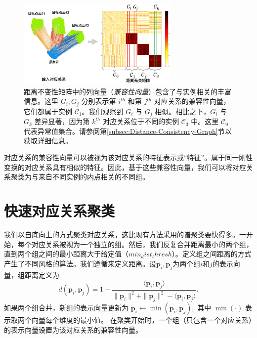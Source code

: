 \begin{figure}[ht]
    \centering
    \includegraphics[width=0.7\textwidth]{images/matrix1.png} %
    \caption{距离不变性矩阵中的列向量（\emph{兼容性向量}）包含了与实例相关的丰富信息。这里 $G_i,G_j$ 分别表示第 $i^{th}$ 和第 $j^{th}$ 对应关系的兼容性向量，它们都属于实例 $\mathcal{C}_1$。我们观察到 $G_i$ 与 $G_j$ 相似。相比之下，$G_i$ 与 $G_k$ 差异显著，因为第 $k^{th}$ 对应关系位于不同的实例 $\mathcal{C}_3$ 中。这里 $\mathcal{C}_0$ 代表异常值集合。请参阅第\ref{subsec:Distance-Consistency-Graph}节以获取详细信息。}
    \label{fig:matrix}
    \vspace{-0.6in}
\end{figure}

对应关系的兼容性向量可以被视为该对应关系的特征表示或“特征”。属于同一刚性变换的对应关系具有相似的特征。因此，基于这些兼容性向量，我们可以将对应关系聚类为与来自不同实例的内点相关的不同组。

\section{快速对应关系聚类}
我们以自底向上的方式聚类对应关系，这比现有方法采用的谱聚类\cite{parra2019practical}\cite{shi2021robin}要快得多。一开始，每个对应关系被视为一个独立的组。然后，我们反复合并距离最小的两个组，直到两个组之间的最小距离大于给定值（$min_dist_thresh$）。定义组之间距离的方式产生了不同风格的算法。我们遵循\cite{Tlinkage}来定义距离。设$\mathbf{p}_i, \mathbf{p}_j$为两个组$i$和$j$的表示向量，组距离定义为
\begin{equation}
d(\mathbf{p}_i, \mathbf{p}_j)= 1-\frac{\langle \mathbf{p}_i,\mathbf{p}_j\rangle}{\parallel \mathbf{p}_i\parallel ^2+\parallel \mathbf{p}_j\parallel ^2-\langle \mathbf{p}_i,\mathbf{p}_j\rangle}.
\end{equation}
如果两个组合并，新组的表示向量更新为
$\mathbf{p}_i \leftarrow \min (\mathbf{p}_i, \mathbf{p}_j),$ 其中 $\min(\cdot)$ 表示取两个向量每个维度的最小值。
在聚类开始时，一个组（只包含一个对应关系）的表示向量设置为该对应关系的兼容性向量。

